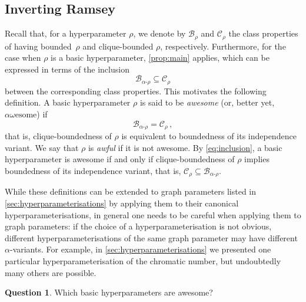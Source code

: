 \documentclass[11pt]{article}
\newcommand{\aw}{$\alpha\omega\text{esome}$\xspace}
\theoremstyle{plain}
\theoremstyle{definition}
\newtheorem{question}[theorem]{Question}
\theoremstyle{remark}
\numberwithin{equation}{section}
\begin{document}
\subsection{Inverting Ramsey}\label{sec:antiRamsey}

Recall that, for a hyperparameter $\rho$, we denote by $\mathcal{B}_\rho$ and $\mathcal{C}_\rho$ the class properties of having bounded~$\rho$ and clique-bounded $\rho$, respectively.
Furthermore, for the case when $\rho$ is a basic hyperparameter, \cref{prop:main} applies, which can be expressed in terms of the inclusion 
\begin{equation}
\mathcal{B}_{\alpha\textrm{-}\rho}\subseteq \mathcal{C}_{\rho}\label{eq:inclusion}
\end{equation}
between the corresponding class properties.
This motivates the following definition.
A basic hyperparameter $\rho$ is said to be \emph{awesome} (or, better yet, \emph{\aw}) 
if \[\mathcal{B}_{\alpha\textrm{-}\rho}= \mathcal{C}_{\rho}\,,\]
that is, clique-boundedness of $\rho$ is equivalent to boundedness of its independence variant.
We say that $\rho$ is \emph{awful} if it is not awesome.
By \cref{eq:inclusion}, a basic hyperparameter is awesome if and only if clique-boundedness of $\rho$ implies boundedness of its independence variant, that is, $\mathcal{C}_{\rho}\subseteq \mathcal{B}_{\alpha\textrm{-}\rho}$.

While these definitions can be extended to graph parameters listed in \cref{sec:hyperparameterisations} by applying them to their canonical hyperparameterisations, in general one needs to be careful when applying them to graph parameters: if the choice of a hyperparameterisation is not obvious, different hyperparameterisations of the same graph parameter may have different $\alpha$-variants.
For example, in \cref{sec:hyperparameterisations} we presented one particular hyperparameterisation of the chromatic number, but undoubtedly many others are possible.

\begin{question}\label{main-question}
Which basic hyperparameters are awesome?
\end{question}
\end{document}
